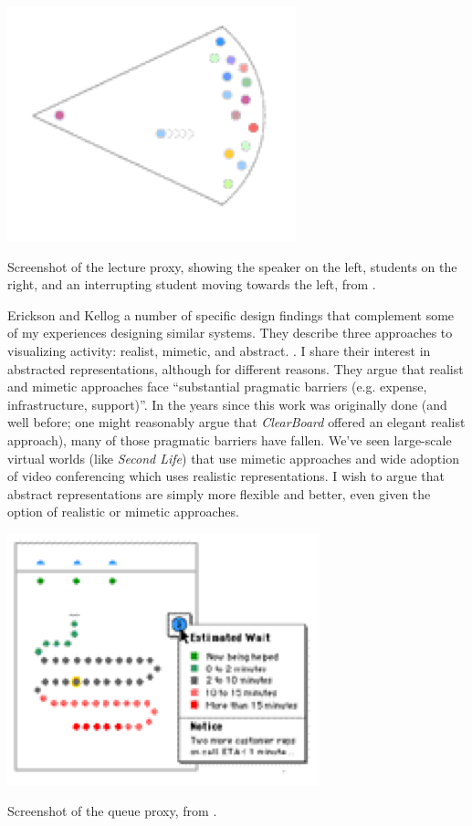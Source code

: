 \begin{marginfigure}
	\includegraphics{figures/lecture.png}
	\caption{Screenshot of the lecture proxy, showing the speaker on the left, students on the right, and an interrupting student moving towards the left, from \citep{Erickson:2003td}.}
	\label{fig:proxy-lecture}
\end{marginfigure}

Erickson and Kellog a number of specific design findings that complement some of my experiences designing similar systems. They describe three approaches to visualizing activity: realist, mimetic, and abstract. \citep{Erickson:2003td}. I share their interest in abstracted representations, although for different reasons. They argue that realist and mimetic approaches face ``substantial pragmatic barriers (e.g. expense, infrastructure, support)''. In the years since this work was originally done (and well before; one might reasonably argue that \emph{ClearBoard} \citep{Ishii:1992bq} offered an elegant realist approach), many of those pragmatic barriers have fallen. We've seen large-scale virtual worlds (like \emph{Second Life}) that use mimetic approaches and wide adoption of video conferencing which uses realistic representations. I wish to argue that abstract representations are simply more flexible and better, even given the option of realistic or mimetic approaches.




\begin{marginfigure}
	\includegraphics{figures/queue.png}
	\caption{Screenshot of the queue proxy, from \citep{Erickson:2003td}.}
	\label{fig:proxy-queue}
\end{marginfigure}

